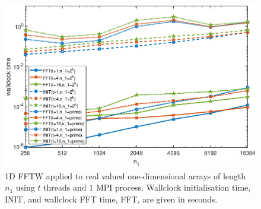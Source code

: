 \documentclass[a4]{article}
\begin{document}
\begin{figure}[!htbp]
\begin{center}
 \includegraphics[width=.9\textwidth, height=0.42\textheight]{FFTW1D_threads_times_fig.eps}
\caption{1D FFTW applied to real valued one-dimensional arrays of length $n_1$ using $t$ threads and 1 MPI process. Wallclock initialisation time, INIT, and wallclock FFT time, FFT, are given in seconds.}
\label{Fig:fftw1d_threads_times}
\end{center}
\end{figure}
\end{document}
